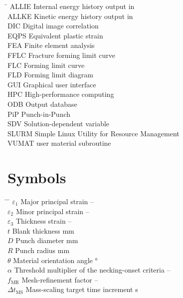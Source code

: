 \begin{tabbing}
 \hspace*{2.4cm} \= \kill
ALLIE \> Internal energy history output in  \\[0.5ex]
ALLKE \> Kinetic energy history output in  \\[0.5ex]
DIC \> Digital image correlation \\[0.5ex]
EQPS \> Equivalent plastic strain \\[0.5ex]
FEA \> Finite element analysis \\[0.5ex]
FFLC \> Fracture forming limit curve \\[0.5ex]
FLC \> Forming limit curve \\[0.5ex]
FLD \> Forming limit diagram \\[0.5ex]
GUI \> Graphical user interface \\[0.5ex]
HPC \> High-performance computing \\[0.5ex]
ODB \> Output database \\[0.5ex]
PiP \> Punch-in-Punch \\[0.5ex]
SDV \> Solution-dependent variable \\[0.5ex]
SLURM \> Simple Linux Utility for Resource Management \\[0.5ex]
VUMAT \>  user material subroutine
\end{tabbing}

\cleardoublepage


\chapter*{Symbols}
\label{chap:symbols}

\begin{tabbing}
 \hspace*{2.0cm} \= \hspace*{8cm} \= \kill
 $\varepsilon_1$ \> Major principal strain \> -- \\[0.5ex]
 $\varepsilon_2$ \> Minor principal strain \> -- \\[0.5ex]
 $\varepsilon_3$ \> Thickness strain \> -- \\[0.5ex]
 $t$ \> Blank thickness \> \si{\milli\meter} \\[0.5ex]
 $D$ \> Punch diameter \> \si{\milli\meter} \\[0.5ex]
 $R$ \> Punch radius \> \si{\milli\meter} \\[0.5ex]
 $\theta$ \> Material orientation angle \> \si{\degree} \\[0.5ex]
 $\alpha$ \> Threshold multiplier of the necking-onset criteria \> -- \\[0.5ex]
 $f_\mathrm{MR}$ \> Mesh-refinement factor \> -- \\[0.5ex]
 $\Delta t_\mathrm{MS}$ \> Mass-scaling target time increment \> \si{\second}
\end{tabbing}

